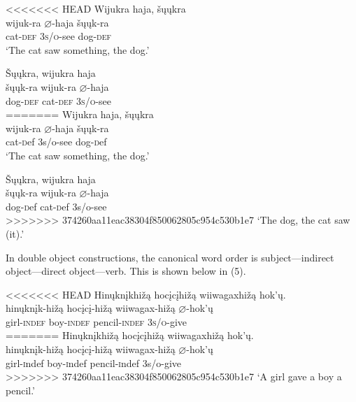 \documentclass[output=paper]{LSP/langsci}
\begin{document}
\begin{exe}
\ex
\begin{xlist}

<<<<<<< HEAD
\ex \glll Wijukra  haja, šųųkra \\
 wijuk-ra {$\varnothing$}-haja  šųųk-ra\\
cat-\textsc{def}  \textsc{3s/o}-see dog-\textsc{def}\\
\glt `The cat saw something, the dog.' 

\ex \glll \v{S}ųųkra, wijukra haja  \\
 šųųk-ra wijuk-ra {$\varnothing$}-haja  \\
dog-\textsc{def} cat-\textsc{def}  \textsc{3s/o}-see \\
=======
\ex \glll Wijukra  haja, \v{s}\k{u}\k{u}kra \\
 wijuk-ra $\varnothing$-haja  \v{s}\k{u}\k{u}k-ra\\
cat-{\textsc def}  {\textsc 3s/o}-see dog-{\textsc def}\\
\glt `The cat saw something, the dog.' 

\ex \glll \v{S}\k{u}\k{u}kra, wijukra haja  \\
 \v{s}\k{u}\k{u}k-ra wijuk-ra $\varnothing$-haja  \\
dog-{\textsc def} cat-{\textsc def}  {\textsc 3s/o}-see \\
>>>>>>> 374260aa11eac38304f850062805c954c530b1e7
\glt `The dog, the cat saw (it).' 

\end{xlist}
\end{exe}

In double object constructions, the canonical word order is subject---indirect object---direct object---verb. This is shown below in (5).

\begin{exe}

<<<<<<< HEAD
\ex \glll Hinųknįkhižą hocįcįhižą wiiwagaxhižą hok'ų.\\
hinųknįk-hižą hocįcį-hižą wiiwagax-hižą {$\varnothing$}-hok'ų\\
girl-\textsc{indef} boy-\textsc{indef} pencil-\textsc{indef} \textsc{3s/o}-give\\
=======
\ex \glll Hin\k{u}kn\k{i}khi\v{z}\k{a} hoc\k{i}c\k{i}hi\v{z}\k{a} wiiwagaxhi\v{z}\k{a} hok'\k{u}.\\
hin\k{u}kn\k{i}k-hi\v{z}\k{a} hoc\k{i}c\k{i}-hi\v{z}\k{a} wiiwagax-hi\v{z}\k{a} $\varnothing$-hok'\k{u}\\
girl-{\textsc indef} boy-{\textsc indef} pencil-{\textsc indef} {\textsc 3s/o}-give\\
>>>>>>> 374260aa11eac38304f850062805c954c530b1e7
\glt `A girl gave a boy a pencil.'

\end{exe}
\end{document}
